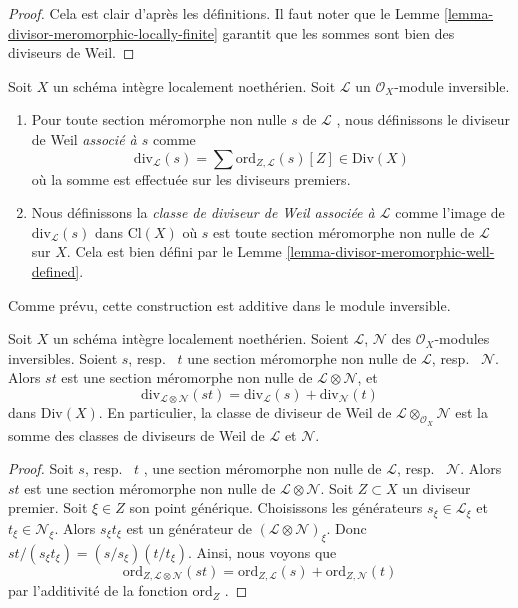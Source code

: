\begin{proof}
Cela est clair d'après les définitions. Il faut noter que le Lemme  \ref{lemma-divisor-meromorphic-locally-finite} 
garantit que les sommes sont bien des diviseurs de Weil.
\end{proof}

\begin{definition}
\label{definition-divisor-invertible-sheaf}
Soit  $X$  un schéma intègre localement noethérien. Soit  $\mathcal{L}$  un
 $\mathcal{O}_X$-module inversible.
\begin{enumerate}
\item Pour toute section méromorphe non nulle  $s$  de  $\mathcal{L}$ , nous
définissons le diviseur de Weil  {\it  associé à
 $s$}  comme
$$
\text{div}_\mathcal{L}(s) =
\sum \text{ord}_{Z, \mathcal{L}}(s) [Z] \in \text{Div}(X)
$$
où la somme est effectuée sur les diviseurs premiers.
\item Nous définissons la  {\it classe de diviseur de Weil associée
à $\mathcal{L}$} comme l'image
de $\text{div}_\mathcal{L}(s)$ dans $\text{Cl}(X)$ où $s$ est toute section méromorphe non nulle
de $\mathcal{L}$ sur $X$. Cela est bien défini par le
Lemme \ref{lemma-divisor-meromorphic-well-defined}.
\end{enumerate}
\end{definition}

\noindent
Comme prévu, cette construction est additive dans le module inversible.

\begin{lemma}
\label{lemma-c1-additive}
Soit  $X$  un schéma intègre localement noethérien. Soient  $\mathcal{L}$,
 $\mathcal{N}$  des  $\mathcal{O}_X$-modules inversibles. Soient  $s$, resp.
\ $t$  une section méromorphe non nulle de  $\mathcal{L}$, resp.
\ $\mathcal{N}$. Alors  $st$  est une section méromorphe non nulle
de  $\mathcal{L} \otimes \mathcal{N}$, et
$$
\text{div}_{\mathcal{L} \otimes \mathcal{N}}(st)
=
\text{div}_\mathcal{L}(s) + \text{div}_\mathcal{N}(t)
$$
dans  $\text{Div}(X)$. En particulier, la classe de diviseur de Weil de  $\mathcal{L} \otimes_{\mathcal{O}_X} \mathcal{N}$ 
est la somme des classes de diviseurs de Weil de  $\mathcal{L}$  et  $\mathcal{N}$.
\end{lemma}

\begin{proof}
Soit  $s$, resp. \ $t$ , une section méromorphe non
nulle de  $\mathcal{L}$, resp. \ $\mathcal{N}$. Alors  $st$  est une
section méromorphe non nulle de  $\mathcal{L} \otimes \mathcal{N}$. Soit  $Z \subset X$  un diviseur
premier. Soit  $\xi \in Z$  son point générique. Choisissons les générateurs
 $s_\xi \in \mathcal{L}_\xi$ et  $t_\xi \in \mathcal{N}_\xi$. Alors  $s_\xi t_\xi$  est un générateur de
 $(\mathcal{L} \otimes \mathcal{N})_\xi$. Donc  $st/(s_\xi t_\xi) = (s/s_\xi)(t/t_\xi)$. Ainsi, nous voyons que
$$
\text{ord}_{Z, \mathcal{L} \otimes \mathcal{N}}(st)
=
\text{ord}_{Z, \mathcal{L}}(s) + \text{ord}_{Z, \mathcal{N}}(t)
$$
par l'additivité de la fonction  $\text{ord}_Z$ .
\end{proof}

